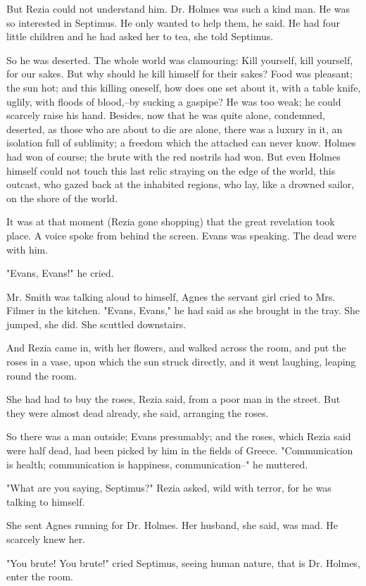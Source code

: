 \documentclass[lang=cn,10pt]{elegantbook}
\begin{document}
But Rezia could not understand him.  Dr. Holmes was such a kind
man.  He was so interested in Septimus.  He only wanted to help
them, he said.  He had four little children and he had asked her to
tea, she told Septimus.

So he was deserted.  The whole world was clamouring:  Kill
yourself, kill yourself, for our sakes.  But why should he kill
himself for their sakes?  Food was pleasant; the sun hot; and this
killing oneself, how does one set about it, with a table knife,
uglily, with floods of blood,--by sucking a gaspipe?  He was too
weak; he could scarcely raise his hand.  Besides, now that he was
quite alone, condemned, deserted, as those who are about to die are
alone, there was a luxury in it, an isolation full of sublimity; a
freedom which the attached can never know.  Holmes had won of
course; the brute with the red nostrils had won.  But even Holmes
himself could not touch this last relic straying on the edge of the
world, this outcast, who gazed back at the inhabited regions, who
lay, like a drowned sailor, on the shore of the world.

It was at that moment (Rezia gone shopping) that the great
revelation took place.  A voice spoke from behind the screen.
Evans was speaking.  The dead were with him.

"Evans, Evans!" he cried.

Mr. Smith was talking aloud to himself, Agnes the servant girl
cried to Mrs. Filmer in the kitchen.  "Evans, Evans," he had said
as she brought in the tray.  She jumped, she did.  She scuttled
downstairs.

And Rezia came in, with her flowers, and walked across the room,
and put the roses in a vase, upon which the sun struck directly,
and it went laughing, leaping round the room.

She had had to buy the roses, Rezia said, from a poor man in the
street.  But they were almost dead already, she said, arranging the
roses.

So there was a man outside; Evans presumably; and the roses, which
Rezia said were half dead, had been picked by him in the fields of
Greece.  "Communication is health; communication is happiness,
communication--" he muttered.

"What are you saying, Septimus?" Rezia asked, wild with terror, for
he was talking to himself.

She sent Agnes running for Dr. Holmes.  Her husband, she said, was
mad.  He scarcely knew her.

"You brute!  You brute!" cried Septimus, seeing human nature, that
is Dr. Holmes, enter the room.
\end{document}
